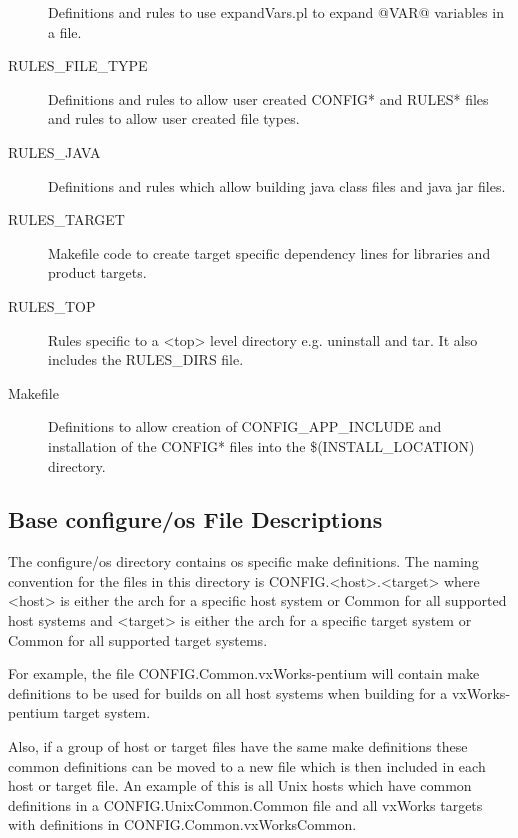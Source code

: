 \begin{description}
Definitions and rules to use expandVars.pl to expand @VAR@ variables in a file.

\item[RULES\_FILE\_TYPE] 

Definitions and rules to allow user created CONFIG* and RULES* files and rules to allow user created file types.

\item[RULES\_JAVA]  
Definitions and rules which allow building java class files and java jar files.

\item[RULES\_TARGET] 

Makefile code to create target specific dependency lines for libraries and product targets.

\item[RULES\_TOP] 

Rules specific to a \textless{}top\textgreater{} level directory e.g. uninstall and tar. It also includes the RULES\_DIRS file.

\item[Makefile] 
Definitions to allow creation of CONFIG\_APP\_INCLUDE and installation of the CONFIG* files into the 
\$(INSTALL\_LOCATION) directory.

\end{description}

\subsection{Base configure/os File Descriptions}

The configure/os directory contains os specific make definitions. The naming convention for the files in this directory is 
CONFIG.\textless{}host\textgreater{}.\textless{}target\textgreater{} where \textless{}host\textgreater{} is either the arch for a specific host system or Common for all supported host 
systems and \textless{}target\textgreater{} is either the arch for a specific target system or Common for all supported target systems. 

For example, the file CONFIG.Common.vxWorks-pentium will contain make definitions to be used for builds on all host 
systems when building for a vxWorks-pentium target system.

Also, if a group of host or target files have the same make definitions these common definitions can be moved to a new 
file which is then included in each host or target file. An example of this is all Unix hosts which have common definitions 
in a CONFIG.UnixCommon.Common file and all vxWorks targets with definitions in 
CONFIG.Common.vxWorksCommon.

